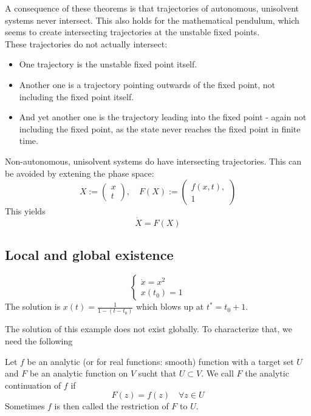 A consequence of these theorems is that trajectories of autonomous, unisolvent systems never intersect. This also holds for the mathematical pendulum, which seems to create intersecting trajectories at the unstable fixed points.\\
These trajectories do not actually intersect: 
\begin{itemize}[itemsep=3pt, topsep=3pt]
    \item One trajectory is the unstable fixed point itself. 
    \item Another one is a trajectory pointing outwards of the fixed point, not including the fixed point itself.
    \item And yet another one is the trajectory leading into the fixed point - again not including the fixed point, as the state never reaches the fixed point in finite time.
\end{itemize}
\bigskip
Non-autonomous, unisolvent systems do have intersecting trajectories. This can be avoided by extening the phase space:
\begin{equation}
    X:=
\begin{pmatrix}
x\\t
\end{pmatrix}
, \quad F(X):= 
\begin{pmatrix}
f(x,t),\\1
\end{pmatrix}
\end{equation}
This yields
\begin{equation}
    \dot X =F(X)
\end{equation}

\subsection{Local and global existence}
\begin{example}
    \begin{equation}
    \begin{cases}
        \dot x = x^2\\
        x(t_0)=1
    \end{cases}
    \end{equation}
    The solution is $x(t) = \frac{1}{1-(t-t_0)}$ which blows up at $t^* = t_0+1$.
\end{example}
The solution of this example does not exist globally. To characterize that, we need the following


\begin{framed}
\begin{definition}
    Let $f$ be an analytic (or for real functions: smooth) function with a target set $U$ and $F$ be an analytic function on $V$ sucht that $U\subset V$. We call $F$ the analytic continuation of $f$ if 
    $$F(z) = f(z) \quad \forall z\in U$$
    Sometimes $f$ is then called the restriction of $F$ to $U$.
\end{definition}
\end{framed}

